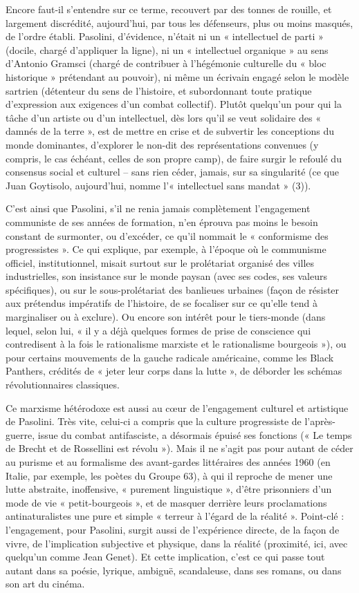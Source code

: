 \documentclass[a4paper,twocolumn]{article}
\begin{document}
Encore faut-il s’entendre sur ce terme, recouvert par des tonnes de rouille, et largement discrédité, aujourd’hui, par tous les défenseurs, plus ou moins masqués, de l’ordre établi. Pasolini, d’évidence, n’était ni un « intellectuel de parti » (docile, chargé d’appliquer la ligne), ni un « intellectuel organique » au sens d’Antonio Gramsci (chargé de contribuer à l’hégémonie culturelle du « bloc historique » prétendant au pouvoir), ni même un écrivain engagé selon le modèle sartrien (détenteur du sens de l’histoire, et subordonnant toute pratique d’expression aux exigences d’un combat collectif). Plutôt quelqu’un pour qui la tâche d’un artiste ou d’un intellectuel, dès lors qu’il se veut solidaire des « damnés de la terre », est de mettre en crise et de subvertir les conceptions du monde dominantes, d’explorer le non-dit des représentations convenues (y compris, le cas échéant, celles de son propre camp), de faire surgir le refoulé du consensus social et culturel – sans rien céder, jamais, sur sa singularité (ce que Juan Goytisolo, aujourd’hui, nomme l’« intellectuel sans mandat  » (3)).

C’est ainsi que Pasolini, s’il ne renia jamais complètement l’engagement communiste de ses années de formation, n’en éprouva pas moins le besoin constant de surmonter, ou d’excéder, ce qu’il nommait le « conformisme des progressistes ». Ce qui explique, par exemple, à l’époque où le communisme officiel, institutionnel, misait surtout sur le prolétariat organisé des villes industrielles, son insistance sur le monde paysan (avec ses codes, ses valeurs spécifiques), ou sur le sous-prolétariat des banlieues urbaines (façon de résister aux prétendus impératifs de l’histoire, de se focaliser sur ce qu’elle tend à marginaliser ou à exclure). Ou encore son intérêt pour le tiers-monde (dans lequel, selon lui, « il y a déjà quelques formes de prise de conscience qui contredisent à la fois le rationalisme marxiste et le rationalisme bourgeois »), ou pour certains mouvements de la gauche radicale américaine, comme les Black Panthers, crédités de « jeter leur corps dans la lutte », de déborder les schémas révolutionnaires classiques.

Ce marxisme hétérodoxe est aussi au cœur de l’engagement culturel et artistique de Pasolini. Très vite, celui-ci a compris que la culture progressiste de l’après-guerre, issue du combat antifasciste, a désormais épuisé ses fonctions (« Le temps de Brecht et de Rossellini est révolu »). Mais il ne s’agit pas pour autant de céder au purisme et au formalisme des avant-gardes littéraires des années 1960 (en Italie, par exemple, les poètes du Groupe 63), à qui il reproche de mener une lutte abstraite, inoffensive, « purement linguistique », d’être prisonniers d’un mode de vie « petit-bourgeois », et de masquer derrière leurs proclamations antinaturalistes une pure et simple « terreur à l’égard de la réalité ». Point-clé : l’engagement, pour Pasolini, surgit aussi de l’expérience directe, de la façon de vivre, de l’implication subjective et physique, dans la réalité (proximité, ici, avec quelqu’un comme Jean Genet). Et cette implication, c’est ce qui passe tout autant dans sa poésie, lyrique, ambiguë, scandaleuse, dans ses romans, ou dans son art du cinéma.
\end{document}
